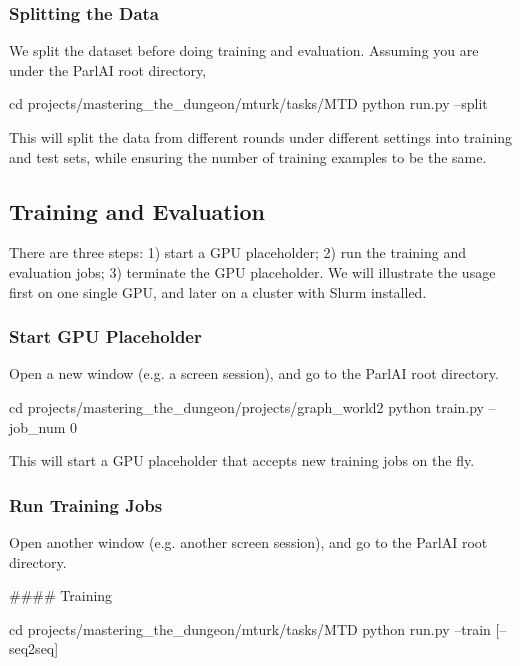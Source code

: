 \subsubsection*{Splitting the Data}

We split the dataset before doing training and evaluation. Assuming you are under the Parl\+AI root directory, 
\begin{DoxyCode}
cd projects/mastering\_the\_dungeon/mturk/tasks/MTD
python run.py --split
\end{DoxyCode}


This will split the data from different rounds under different settings into training and test sets, while ensuring the number of training examples to be the same.

\subsection*{Training and Evaluation}

There are three steps\+: 1) start a G\+PU placeholder; 2) run the training and evaluation jobs; 3) terminate the G\+PU placeholder. We will illustrate the usage first on one single G\+PU, and later on a cluster with Slurm installed.

\subsubsection*{Start G\+PU Placeholder}

Open a new window (e.\+g. a screen session), and go to the Parl\+AI root directory. 
\begin{DoxyCode}
cd projects/mastering\_the\_dungeon/projects/graph\_world2
python train.py --job\_num 0
\end{DoxyCode}


This will start a G\+PU placeholder that accepts new training jobs on the fly.

\subsubsection*{Run Training Jobs}

Open another window (e.\+g. another screen session), and go to the Parl\+AI root directory.

\#\#\#\# Training 
\begin{DoxyCode}
cd projects/mastering\_the\_dungeon/mturk/tasks/MTD
python run.py --train [--seq2seq]
\end{DoxyCode}


